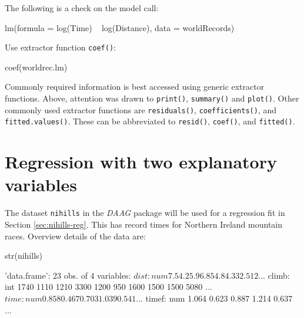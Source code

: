 \documentclass{tufte-book}\usepackage[]{graphicx}\usepackage[]{color}
\newcommand{\txtt}[1]{\texttt{#1}}
\newcommand{\margtt}[1]{{\footnotesize \texttt{#1}}}
\begin{document}
The following is a check on the model call:
\begin{fullwidth}

\begin{Schunk}
\begin{Soutput}
lm(formula = log(Time) ~ log(Distance), data = worldRecords)
\end{Soutput}
\end{Schunk}

\end{fullwidth}

\begin{marginfigure}[40pt]
Use extractor function \margtt{coef()}:\\[-3pt]
\begin{Schunk}
\begin{Sinput}
coef(worldrec.lm)
\end{Sinput}
\end{Schunk}
\end{marginfigure}
Commonly required information is best accessed using generic
extractor functions.  Above, attention was drawn to \txtt{print()},
\txtt{summary()} and \txtt{plot()}.  Other commonly used extractor
functions are \txtt{residuals()}, \txtt{coefficients()}, and
\txtt{fitted.values()}. These can be abbreviated to \txtt{resid()},
\txtt{coef()}, and \txtt{fitted()}.

\section{Regression with two explanatory variables}\label{sec:nihills}

The dataset \txtt{nihills} in the {\em DAAG} package will be used for
a regression fit in Section \ref{sec:nihills-reg}.  This has record
times for Northern Ireland mountain races. Overview details of the
data are:
\begin{fullwidth}
\begin{Schunk}
\begin{Sinput}
str(nihills)
\end{Sinput}
\begin{Soutput}
'data.frame':	23 obs. of  4 variables:
 $ dist : num  7.5 4.2 5.9 6.8 5 4.8 4.3 3 2.5 12 ...
 $ climb: int  1740 1110 1210 3300 1200 950 1600 1500 1500 5080 ...
 $ time : num  0.858 0.467 0.703 1.039 0.541 ...
 $ timef: num  1.064 0.623 0.887 1.214 0.637 ...
\end{Soutput}
\end{Schunk}
\end{fullwidth}
\end{document}
